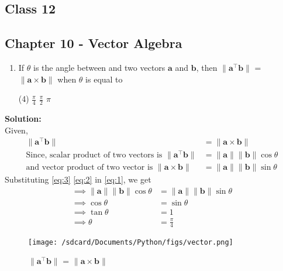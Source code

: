 \documentclass{article}
\newcommand{\norm}[1]{\lVert#1\rVert}
\renewcommand{\vec}[1]{\textbf{#1}}
\begin{document}
\onehalfspacing
\begin{center}
  \section*{\textbf{Class 12}}
  \subsection*{Chapter 10 - Vector Algebra}
\end{center}
\begin{enumerate}
  \item If $\theta$ is the angle between and two vectors $\vec{a}$ and $\vec{b}$, then $\norm{\vec{a}^{\top}\vec{b}}$ = $\norm{\vec{a}\times\vec{b}}$ when $\theta$ is equal to
    \begin{tasks}(4)
      \task $\frac{\pi}{4}$
      \task $\frac{\pi}{2}$
      \task $\pi$
      \end{tasks}
\end{enumerate}
  \textbf{Solution:}
  \\
Given,
\begin{align}
  \norm{\vec{a}^{\top}\vec{b}} &= \norm{\vec{a} \times \vec{b}} \label{eq:1}
  \\
  \text{Since, scalar product of two vectors is } \norm{\vec{a}^{\top}\vec{b}} &= \norm{\vec{a}}\norm{\vec{b}}\cos{\theta} \label{eq:2}
  \\
  \text{and vector product of two vector is }\norm{\vec{a} \times \vec{b}} &= \norm{\vec{a}}\norm{\vec{b}}\sin{\theta} \label{eq:3}
\end{align}
Substituting \eqref{eq:3} \eqref{eq:2} in \eqref{eq:1}, we get
\\
\begin{align}
  \implies \norm{\vec{a}}\norm{\vec{b}}\cos{\theta} &= \norm{\vec{a}}\norm{\vec{b}}\sin{\theta}\\
  \implies \cos{\theta} &= \sin{\theta}\\
  \implies \tan{\theta} &= 1\\
  \implies \theta &= \frac{\pi}{4}
\end{align}
\begin{figure}
  \begin{center}
    \texttt{[image: /sdcard/Documents/Python/figs/vector.png]}
  \end{center}
  \caption{$\norm{\vec{a}^{\top}\vec{b}}$ = $\norm{\vec{a}\times\vec{b}}$}
  \label{fig:12.10.5.19}
\end{figure}
\end{document}
